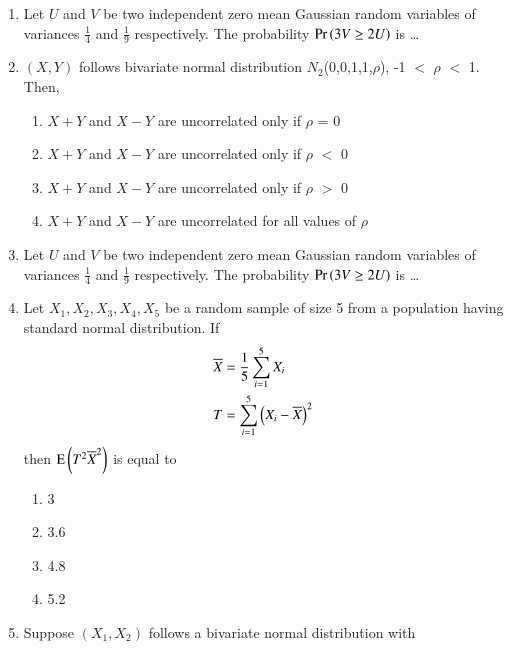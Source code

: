 \renewcommand{\theequation}{\theenumi}
\renewcommand{\thefigure}{\theenumi}
\renewcommand{\thetable}{\theenumi}
\begin{enumerate}[label=\thesection.\arabic*.,ref=\thesection.\theenumi]

\item Let $U$ and $V$ be two independent zero mean Gaussian random variables of variances $\frac{1}{4}$ and $\frac{1}{9}$ respectively. The probability $\Pr\left(3V \geq 2U\right)$ is \dots
\\
\solution

%
\item $(X,Y)$ follows bivariate normal distribution $N_2$(0,0,1,1,$\rho$),  -1 $<$ $\rho$ $<$ 1. Then,
\begin{enumerate}
    \item $X+Y$ and $X-Y$ are uncorrelated only if $\rho$ = 0
    \item $X+Y$ and $X-Y$ are uncorrelated only if $\rho$ $<$ 0
    \item $X+Y$ and $X-Y$ are uncorrelated only if $\rho$ $>$ 0
    \item $X+Y$ and $X-Y$ are uncorrelated for all values of $\rho$
\end{enumerate}
\solution

%
\item Let $U$ and $V$ be two independent zero mean Gaussian random variables of variances $\frac{1}{4}$ and $\frac{1}{9}$ respectively. The probability $\Pr\left(3V \geq 2U\right)$ is \dots
\\
\solution

%
\item Let $X_1,X_2,X_3,X_4,X_5$ be a random sample of size 5 from a population having standard normal distribution. If 
\begin{align}
    \label{gauss/3/mean}
    \overline{X}&=\frac{1}{5}\sum_{i=1}^5 X_i
    \\
    T &=\sum_{i=1}^5\left(X_i-\overline{X}\right)^2
    \label{gauss/3/var}
\end{align}
%
then $\text{E}\left( T^2\overline{X}^2 \right)$ is equal to 
\begin{enumerate}
    \item 3
    \item 3.6
    \item 4.8
    \item 5.2
\end{enumerate} 
\solution

%
\item Suppose $(X_1,X_2)$ follows a bivariate  normal distribution with

\end{enumerate}
